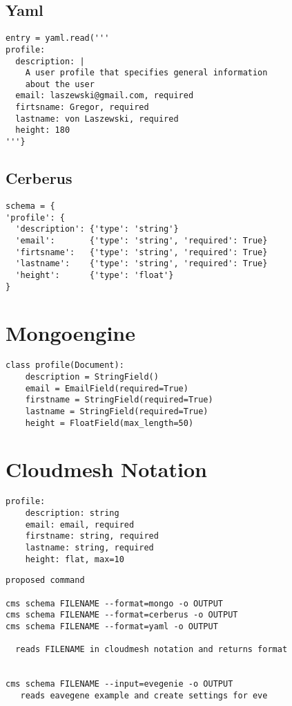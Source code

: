 \documentclass[9pt,twocolumn,twoside]{styles/osajnl}
\begin{document}
\subsection{Yaml}

\begin{Verbatim}
entry = yaml.read('''
profile:
  description: |
    A user profile that specifies general information 
    about the user
  email: laszewski@gmail.com, required
  firtsname: Gregor, required
  lastname: von Laszewski, required
  height: 180
'''}
\end{Verbatim}

\subsection{Cerberus}

\begin{Verbatim}
schema = {
'profile': {
  'description': {'type': 'string'}
  'email':       {'type': 'string', 'required': True}
  'firtsname':   {'type': 'string', 'required': True}
  'lastname':    {'type': 'string', 'required': True}
  'height':      {'type': 'float'}
}
\end{Verbatim}

\section{Mongoengine}

\begin{Verbatim}
class profile(Document):
    description = StringField()
    email = EmailField(required=True)
    firstname = StringField(required=True)
    lastname = StringField(required=True)
    height = FloatField(max_length=50)
\end{Verbatim}

\section{Cloudmesh Notation}

\begin{Verbatim}
profile:
    description: string
    email: email, required
    firstname: string, required
    lastname: string, required
    height: flat, max=10
\end{Verbatim}

\begin{Verbatim}
proposed command

cms schema FILENAME --format=mongo -o OUTPUT
cms schema FILENAME --format=cerberus -o OUTPUT
cms schema FILENAME --format=yaml -o OUTPUT

  reads FILENAME in cloudmesh notation and returns format


cms schema FILENAME --input=evegenie -o OUTPUT
   reads eavegene example and create settings for eve
\end{Verbatim}
\end{document}
